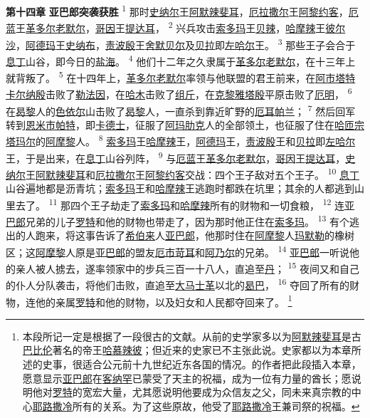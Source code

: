 \textbf{第十四章 }
\textbf{亚巴郎突袭获胜 }
\textsuperscript{1}
那时\uline{史纳尔}王\uline{阿默}\uline{辣斐耳}，\uline{厄拉}\uline{撒尔}王\uline{阿黎约客}，\uline{厄蓝}王\uline{革多尔}\uline{老默尔}，\uline{哥因}王\uline{提达耳}，
\textsuperscript{2}
兴兵攻击\uline{索多玛}王\uline{贝辣}，\uline{哈摩辣}王\uline{彼尔沙}，\uline{阿德玛}王\uline{史纳布}，\uline{责波殷}王\uline{舍默}\uline{贝尔}及\uline{贝拉}即\uline{左哈尔}王。
\textsuperscript{3}
那些王子会合于\uline{息丁}山谷，即今日的\uline{盐海}。
\textsuperscript{4}
他们十二年之久隶属于\uline{革多尔}\uline{老默尔}，在十三年上就背叛了。
\textsuperscript{5}
在十四年上，\uline{革多尔}\uline{老默尔}率领与他联盟的君王前来，在\uline{阿市}\uline{塔特}\uline{卡尔}\uline{纳殷}击败了\uline{勒法因}，在\uline{哈木}击败了\uline{组斤}，在\uline{克黎}\uline{雅塔殷}平原击败了\uline{厄明}，
\textsuperscript{6}
在\uline{曷黎}人的\uline{色依尔}山击败了\uline{曷黎}人，一直杀到靠近旷野的\uline{厄耳帕兰}；
\textsuperscript{7}
然后回军转到\uline{恩米市}\uline{帕特}，即\uline{卡德士}，征服了\uline{阿玛肋克}人的全部领土，也征服了住在\uline{哈匝宗}\uline{塔玛尔}的\uline{阿摩黎}人。
\textsuperscript{8}
\uline{索多玛}王\uline{哈摩辣}王，\uline{阿德玛}王，\uline{责波殷}王和\uline{贝拉}即\uline{左哈尔}王，于是出来，在\uline{息丁}山谷列阵，
\textsuperscript{9}
与\uline{厄蓝}王\uline{革多尔}\uline{老默尔}，\uline{哥因}王\uline{提达耳}，\uline{史纳尔}王\uline{阿默}\uline{辣斐耳}和\uline{厄拉}\uline{撒尔}王\uline{阿黎约客}交战：四个王子敌对五个王子。
\textsuperscript{10}
\uline{息丁}山谷遍地都是沥青坑；\uline{索多玛}王和\uline{哈摩辣}王逃跑时都跌在坑里；其余的人都逃到山里去了。
\textsuperscript{11}
那四个王子劫走了\uline{索多玛}和\uline{哈摩辣}所有的财物和一切食粮，
\textsuperscript{12}
连\uline{亚巴郎}兄弟的儿子\uline{罗特}和他的财物也带走了，因为那时他正住在\uline{索多玛}。
\textsuperscript{13}
有个逃出的人跑来，将这事告诉了\uline{希伯来}人\uline{亚巴郎}，他那时住在\uline{阿摩黎}人\uline{玛默勒}的橡树区；这\uline{阿摩黎}人原是\uline{亚巴郎}的盟友\uline{厄市}\uline{苛耳}和\uline{阿乃尔}的兄弟。
\textsuperscript{14}
\uline{亚巴郎}一听说他的亲人被人掳去，遂率领家中的步兵三百一十八人，直追至\uline{丹}；
\textsuperscript{15}
夜间又和自己的仆人分队袭击，将他们击败，直追至\uline{大马}\uline{士革}以北的\uline{曷巴}，
\textsuperscript{16}
夺回了所有的财物，连他的亲属\uline{罗特}和他的财物，以及妇女和人民都夺回来了。
\footnote{本段所记一定是根据了一段很古的文献。从前的史学家多以为\uline{阿默}\uline{辣斐耳}是古\uline{巴比伦}著名的帝王\uline{哈慕辣彼}；但近来的史家已不主张此说。史家都以为本章所述的史事，很适合公元前十九世纪近东各国的情况。的作者把此段插入本章，愿意显示\uline{亚巴郎}在\uline{客纳罕}已蒙受了天主的祝福，成为一位有力量的酋长；愿说明他对\uline{罗特}的宽宏大量，尤其愿说明他要成为众信友之父，同未来真宗教的中心\uline{耶路撒冷}所有的关系。为了这些原故，他受了\uline{耶路撒冷}王兼司祭的祝福。}

